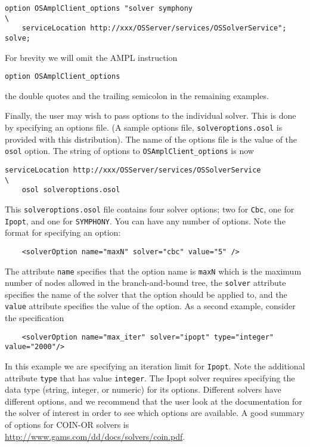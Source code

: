 \begin{verbatim}
option OSAmplClient_options "solver symphony                                         \
    serviceLocation http://xxx/OSServer/services/OSSolverService";
solve;
\end{verbatim}


For brevity we will omit the AMPL instruction
\begin{verbatim}
option OSAmplClient_options
\end{verbatim}
the double quotes and the trailing semicolon in the remaining examples.  

\medskip

Finally, the user may wish to pass options to the individual solver. This is done by specifying an options file.
(A sample options file, {\tt solveroptions.osol}\index{solveroptions.osol@{\tt solveroptions.osol}} is 
provided with this distribution).  The name of the options file is the value of the {\tt osol} option.
The string of options to {\tt OSAmplClient\_options} is now
\begin{verbatim}
serviceLocation http://xxx/OSServer/services/OSSolverService              \
    osol solveroptions.osol
\end{verbatim}
This   {\tt solveroptions.osol}  file contains four solver options; two for {\tt Cbc}, one for {\tt Ipopt}, 
and one for {\tt SYMPHONY}.
You can have any number of options. Note the format for specifying an option:
\begin{verbatim}
    <solverOption name="maxN" solver="cbc" value="5" />
\end{verbatim}
The attribute {\tt name} specifies that the option name is {\tt maxN} which is the maximum number of nodes 
allowed in the branch-and-bound tree, the {\tt solver} attribute specifies the name of the solver that the 
option should be applied to, and the {\tt value} attribute specifies the value of the option. 
As a second example, consider the specification
\begin{verbatim}
    <solverOption name="max_iter" solver="ipopt" type="integer" value="2000"/> 
\end{verbatim}
In this example we are specifying an iteration limit for {\tt Ipopt}.  Note the additional attribute 
{\tt type} that has value  {\tt integer}. The Ipopt solver requires specifying the data type 
(string, integer, or numeric) for its options.   Different solvers have different options, 
and we recommend that the user look at the documentation for the solver of interest in order to see 
which options are available.  
A good summary of options for COIN-OR solvers is 
\url{http://www.gams.com/dd/docs/solvers/coin.pdf}.

